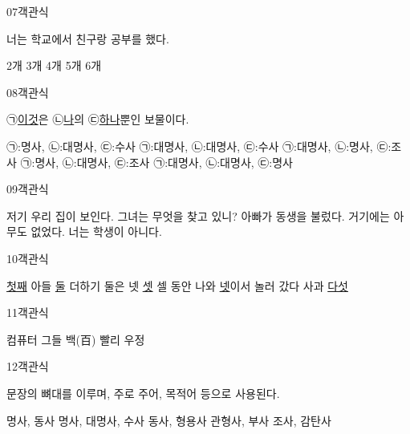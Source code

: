 \documentclass[fs9,seriesRus]{korfarm-base}
\begin{document}
\begin{kfQBlock}{07}{객관식}
\begin{kfEvidence}너는 학교에서 친구랑 공부를 했다.\end{kfEvidence}
\begin{kfChoices}
\kfChoice 2개
\kfChoice 3개
\kfChoice 4개
\kfChoice 5개
\kfChoice 6개
\end{kfChoices}
\end{kfQBlock}
\begin{kfQBlock}{08}{객관식}
\begin{kfEvidence}㉠\uline{이것}은 ㉡\uline{나}의 ㉢\uline{하나}뿐인 보물이다.\end{kfEvidence}
\begin{kfChoices}
\kfChoice ㉠:명사, ㉡:대명사, ㉢:수사
\kfChoice ㉠:대명사, ㉡:대명사, ㉢:수사
\kfChoice ㉠:대명사, ㉡:명사, ㉢:조사
\kfChoice ㉠:명사, ㉡:대명사, ㉢:조사
\kfChoice ㉠:대명사, ㉡:대명사, ㉢:명사
\end{kfChoices}
\end{kfQBlock}
\begin{kfQBlock}{09}{객관식}
\begin{kfChoices}
\kfChoice 저기 우리 집이 보인다.
\kfChoice 그녀는 무엇을 찾고 있니?
\kfChoice 아빠가 동생을 불렀다.
\kfChoice 거기에는 아무도 없었다.
\kfChoice 너는 학생이 아니다.
\end{kfChoices}
\end{kfQBlock}
\begin{kfQBlock}{10}{객관식}
\begin{kfChoices}
\kfChoice \uline{첫째} 아들
\kfChoice \uline{둘} 더하기 둘은 넷
\kfChoice \uline{셋} 셀 동안 나와
\kfChoice \uline{넷}이서 놀러 갔다
\kfChoice 사과 \uline{다섯}
\end{kfChoices}
\end{kfQBlock}
\begin{kfQBlock}{11}{객관식}
\begin{kfChoices}
\kfChoice 컴퓨터
\kfChoice 그들
\kfChoice 백(百)
\kfChoice 빨리
\kfChoice 우정
\end{kfChoices}
\end{kfQBlock}
\begin{kfQBlock}{12}{객관식}
\begin{kfEvidence}문장의 뼈대를 이루며, 주로 주어, 목적어 등으로 사용된다.\end{kfEvidence}
\begin{kfChoices}
\kfChoice 명사, 동사
\kfChoice 명사, 대명사, 수사
\kfChoice 동사, 형용사
\kfChoice 관형사, 부사
\kfChoice 조사, 감탄사
\end{kfChoices}
\end{kfQBlock}
\end{document}
